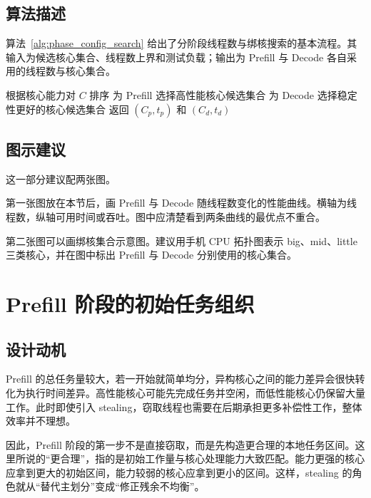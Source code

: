 \subsection{算法描述}

算法~\ref{alg:phase_config_search} 给出了分阶段线程数与绑核搜索的基本流程。其输入为候选核心集合、线程数上界和测试负载；输出为 Prefill 与 Decode 各自采用的线程数与核心集合。

\begin{algorithm}[ht]
\caption{分阶段线程数与绑核参数搜索}
\label{alg:phase_config_search}
根据核心能力对 $C$ 排序\;
为 Prefill 选择高性能核心候选集合\;
为 Decode 选择稳定性更好的核心候选集合\;
返回 $(C_p, t_p)$ 和 $(C_d, t_d)$\;
\end{algorithm}

\subsection{图示建议}

这一部分建议配两张图。

第一张图放在本节后，画 Prefill 与 Decode 随线程数变化的性能曲线。横轴为线程数，纵轴可用时间或吞吐。图中应清楚看到两条曲线的最优点不重合。

第二张图可以画绑核集合示意图。建议用手机 CPU 拓扑图表示 big、mid、little 三类核心，并在图中标出 Prefill 与 Decode 分别使用的核心集合。

\section{Prefill 阶段的初始任务组织}

\subsection{设计动机}

Prefill 的总任务量较大，若一开始就简单均分，异构核心之间的能力差异会很快转化为执行时间差异。高性能核心可能先完成任务并空闲，而低性能核心仍保留大量工作。此时即使引入 stealing，窃取线程也需要在后期承担更多补偿性工作，整体效率并不理想。

因此，Prefill 阶段的第一步不是直接窃取，而是先构造更合理的本地任务区间。这里所说的“更合理”，指的是初始工作量与核心处理能力大致匹配。能力更强的核心应拿到更大的初始区间，能力较弱的核心应拿到更小的区间。这样，stealing 的角色就从“替代主划分”变成“修正残余不均衡”。

